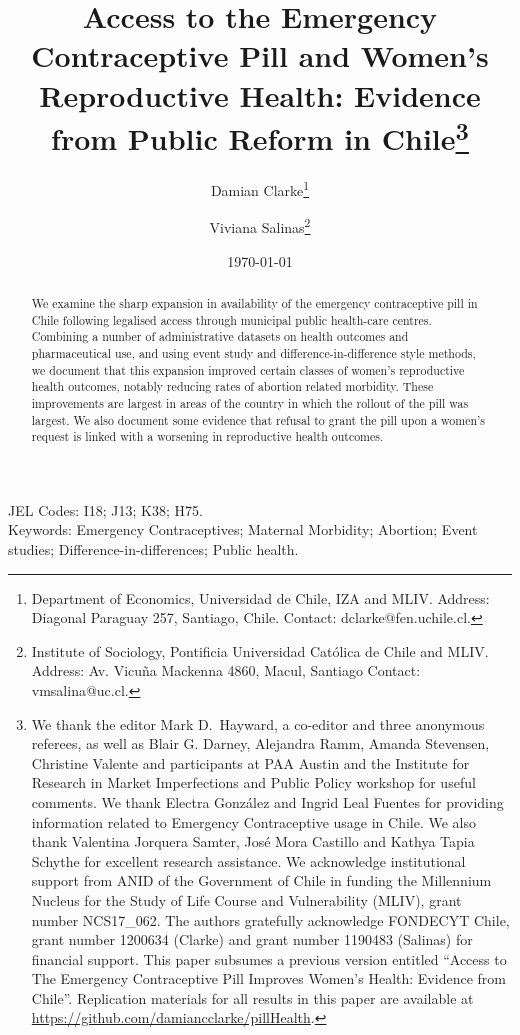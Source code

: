 \documentclass[12pt]{article}
\title{{\Large Access to the Emergency Contraceptive Pill and Women's Reproductive Health: Evidence from Public Reform in Chile}\thanks{We thank the editor Mark D.\ Hayward, a co-editor and three anonymous referees, as well as Blair G. Darney, Alejandra Ramm, Amanda Stevensen, Christine Valente and participants at PAA Austin and the Institute for Research in Market Imperfections and Public Policy workshop for useful comments.  We thank Electra Gonz\'alez and Ingrid Leal Fuentes for providing information related to Emergency Contraceptive usage in Chile.  We also thank Valentina Jorquera Samter, Jos\'e Mora Castillo and Kathya Tapia Schythe for excellent research assistance.  We acknowledge institutional support from ANID of the Government of Chile in funding the Millennium Nucleus for the Study of Life Course and Vulnerability (MLIV), grant number NCS17\_062. The authors gratefully acknowledge FONDECYT Chile, grant number 1200634 (Clarke) and grant number 1190483 (Salinas) for financial support.    This paper subsumes a previous version entitled ``Access to The Emergency Contraceptive Pill Improves Women's Health: Evidence from Chile''. Replication materials for all results in this paper are available at \url{https://github.com/damiancclarke/pillHealth}.}}
\author{Damian Clarke\thanks{Department of Economics, Universidad de Chile, IZA and MLIV. Address: Diagonal Paraguay 257, Santiago, Chile. Contact: dclarke@fen.uchile.cl.} \and Viviana Salinas\thanks{Institute of Sociology, Pontificia Universidad Cat\'olica de Chile and MLIV. Address: Av. Vicu\~na Mackenna 4860, Macul, Santiago Contact: vmsalina@uc.cl.}}
\date{\today}
\begin{document}
\setcounter{page}{-0}
\begin{spacing}{1.25}
  \maketitle
  \begin{abstract}
    We examine the sharp expansion in availability of the emergency contraceptive pill in Chile
    following legalised access through municipal public health-care centres.  Combining a number
    of administrative datasets on health outcomes and pharmaceutical use, and using
    event study and difference-in-difference style methods, we document that this
    expansion improved certain classes of women's reproductive health outcomes, notably
    reducing rates of abortion related morbidity.  These improvements are largest 
    in areas of the country in which the rollout of the pill was largest.  We also document 
    some evidence that refusal to grant the pill upon a women's request is linked with a worsening in reproductive health outcomes.
  \end{abstract}

  \noindent JEL Codes: I18; J13; K38; H75. \\
  Keywords: Emergency Contraceptives; Maternal Morbidity; Abortion; Event studies; Difference-in-differences; Public health. \\
\end{spacing}
\clearpage
\end{document}
